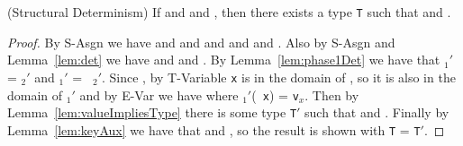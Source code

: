 \begin{Theorem} (Structural Determinism)
  If
  \emph{} and
  \emph{} 
  and \emph{}, then there exists a type {\tt T}
  such that
\emph{} and
\emph{}.
\end{Theorem}
\begin{proof}
By {\sc S-Asgn} we have      
and  and
 and
 and
     and
.
Also by {\sc S-Asgn} and Lemma~\ref{lem:det}
we have
 and
     and
.
By Lemma~\ref{lem:phase1Det} we have that  {\tt \Euid$_1'$} = {\tt \Euid$_2'$} and {\tt \Huid$_1'$} = {\tt
  \Huid$_2'$}.  Since , by {\sc
  T-Variable} {\tt x} is in the domain of {\tt \Euid}, so it is also in
the domain of {\tt \Euid$_1'$} and by {\sc E-Var} we have
 where {\tt \Euid$_1'$}({\tt
  x}) = {\tt v$_x$}.
Then by Lemma~\ref{lem:valueImpliesType} there is some type {\tt T$'$}
such that  
and .  Finally by
Lemma~\ref{lem:keyAux} we have that  and
, so the result is shown with {\tt T} =
{\tt T$'$}.

\end{proof}


